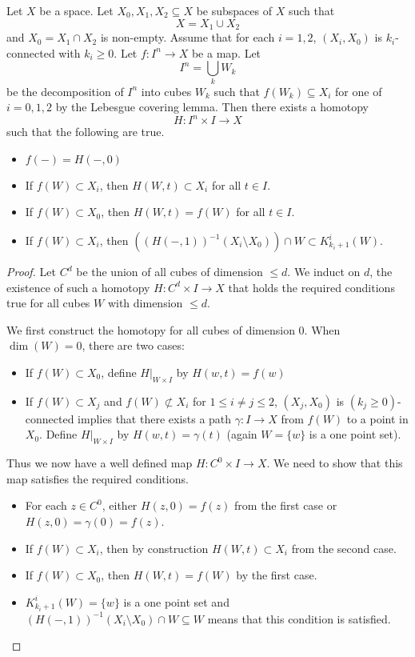 \begin{lmm}{}{} Let $X$ be a space. Let $X_0,X_1,X_2\subseteq X$ be subspaces of $X$ such that $$X=X_1\cup X_2$$ and $X_0=X_1\cap X_2$ is non-empty. Assume that for each $i=1,2$, $(X_i,X_0)$ is $k_i$-connected with $k_i\geq 0$. Let $f:I^n\to X$ be a map. Let $$I^n=\bigcup_k W_k$$ be the decomposition of $I^n$ into cubes $W_k$ such that $f(W_k)\subseteq X_i$ for one of $i=0,1,2$ by the Lebesgue covering lemma. Then there exists a homotopy $$H:I^n\times I\to X$$ such that the following are true. 
\begin{itemize}
\item $f(-)=H(-,0)$
\item If $f(W)\subset X_i$, then $H(W,t)\subset X_i$ for all $t\in I$. 
\item If $f(W)\subset X_0$, then $H(W,t)=f(W)$ for all $t\in I$. 
\item If $f(W)\subset X_i$, then $\left((H(-,1))^{-1}(X_i\setminus X_0)\right)\cap W\subset K_{k_i+1}^i(W)$. 
\end{itemize} 
\begin{proof}
Let $C^d$ be the union of all cubes of dimension $\leq d$. We induct on $d$, the existence of such a homotopy $H:C^d\times I\to X$ that holds the required conditions true for all cubes $W$ with dimension $\leq d$. 

We first construct the homotopy for all cubes of dimension $0$. When $\dim(W)=0$, there are two cases: 
\begin{itemize}
\item If $f(W)\subset X_0$, define $H|_{W\times I}$ by $H(w,t)=f(w)$
\item If $f(W)\subset X_j$ and $f(W)\not\subset X_i$ for $1\leq i\neq j\leq 2$, $(X_j,X_0)$ is $(k_j\geq 0)$-connected implies that there exists a path $\gamma:I\to X$ from $f(W)$ to a point in $X_0$. Define $H|_{W\times I}$ by $H(w,t)=\gamma(t)$ (again $W=\{w\}$ is a one point set). 
\end{itemize}
Thus we now have a well defined map $H:C^0\times I\to X$. We need to show that this map satisfies the required conditions. 
\begin{itemize}
\item For each $z\in C^0$, either $H(z,0)=f(z)$ from the first case or $H(z,0)=\gamma(0)=f(z)$. 
\item If $f(W)\subset X_i$, then by construction $H(W,t)\subset X_i$ from the second case. 
\item If $f(W)\subset X_0$, then $H(W,t)=f(W)$ by the first case. 
\item $K_{k_i+1}^i(W)=\{w\}$ is a one point set and $(H(-,1))^{-1}(X_i\setminus X_0)\cap W\subseteq W$ means that this condition is satisfied. 
\end{itemize}


\end{proof}
\end{lmm}

